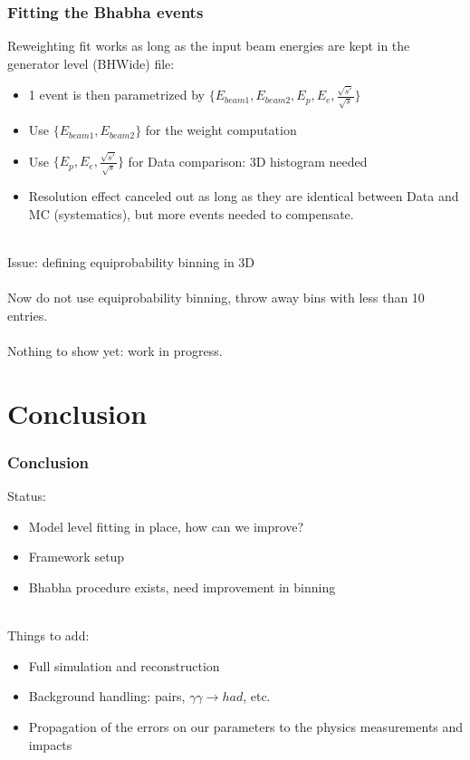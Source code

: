 \documentclass{beamer}
\begin{document}
\begin{frame}
\frametitle{Fitting the Bhabha events}
Reweighting fit works as long as the input beam energies are kept in the
generator level (BHWide) file:
\begin{itemize}
  \item 1 event is then parametrized by
  $\{E_{beam1},E_{beam2},E_{p},E_{e},\frac{\sqrt{s'}}{\sqrt{s}}\}$
  \item Use $\{E_{beam1},E_{beam2}\}$ for the weight computation
  \item Use $\{E_{p},E_{e},\frac{\sqrt{s'}}{\sqrt{s}}\}$ for Data comparison: 3D
  histogram needed
  \item Resolution effect canceled out as long as they are identical between
  Data and MC (systematics), but more events needed to compensate.
\end{itemize}
~\\
Issue: defining equiprobability binning in 3D\\
~\\
Now do not use equiprobability binning, throw away bins with less than 10
entries.\\
~\\
Nothing to show yet: \alert{work in progress}.
\end{frame}



\section{Conclusion}
\begin{frame}
\frametitle{Conclusion}
Status:
\begin{itemize}
  \item Model level fitting in place, how can we improve?
  \item Framework setup
  \item Bhabha procedure exists, need improvement in binning
\end{itemize}
~\\
Things to add:
\begin{itemize}
  \item Full simulation and reconstruction
  \item Background handling: pairs, $\gamma\gamma \to had$, etc.
  \item Propagation of the errors on our parameters to the physics measurements
  and impacts
\end{itemize}
\end{frame}
\end{document}
